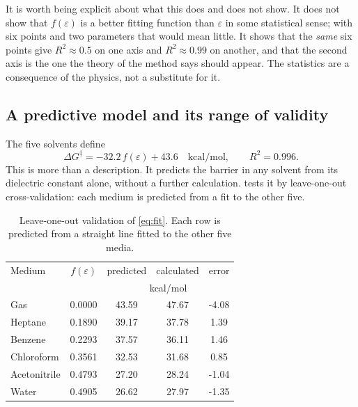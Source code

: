 \documentclass[10pt,a4paper]{article}
\begin{document}
It is worth being explicit about what this does and does not show. It does not show
that $f(\varepsilon)$ is a better fitting function than $\varepsilon$ in some
statistical sense; with six points and two parameters that would mean little. It
shows that the \emph{same} six points give $R^{2} \approx 0.5$ on one axis and
$R^{2} \approx 0.99$ on another, and that the second axis is the one the theory of
the method says should appear. The statistics are a consequence of the physics, not
a substitute for it.

\subsection{A predictive model and its range of validity}

The five solvents define
%
\begin{equation}
  \Delta G^{\ddagger} = -32.2\,f(\varepsilon) + 43.6
  \quad\text{kcal/mol},\qquad R^{2} = 0.996 .
  \label{eq:fit}
\end{equation}
%
This is more than a description. It predicts the barrier in any solvent from its
dielectric constant alone, without a further calculation.
 tests it by leave-one-out cross-validation: each medium is predicted
from a fit to the other five.

\begin{table}[H]
  \centering
  \caption{Leave-one-out validation of \cref{eq:fit}. Each row is predicted from a
    straight line fitted to the other five media.}
  \label{tab:loo}
  \small
  \begin{tabular}{l S[table-format=1.4] S[table-format=2.2] S[table-format=2.2] S[table-format=-1.2]}
    \toprule
    Medium & {$f(\varepsilon)$} & {predicted} & {calculated} & {error} \\
    & &  \\
    \midrule
    Gas          & 0.0000 & 43.59 & 47.67 & -4.08 \\
    Heptane      & 0.1890 & 39.17 & 37.78 &  1.39 \\
    Benzene      & 0.2293 & 37.57 & 36.11 &  1.46 \\
    Chloroform   & 0.3561 & 32.53 & 31.68 &  0.85 \\
    Acetonitrile & 0.4793 & 27.20 & 28.24 & -1.04 \\
    Water        & 0.4905 & 26.62 & 27.97 & -1.35 \\
    \bottomrule
  \end{tabular}
\end{table}
\end{document}
